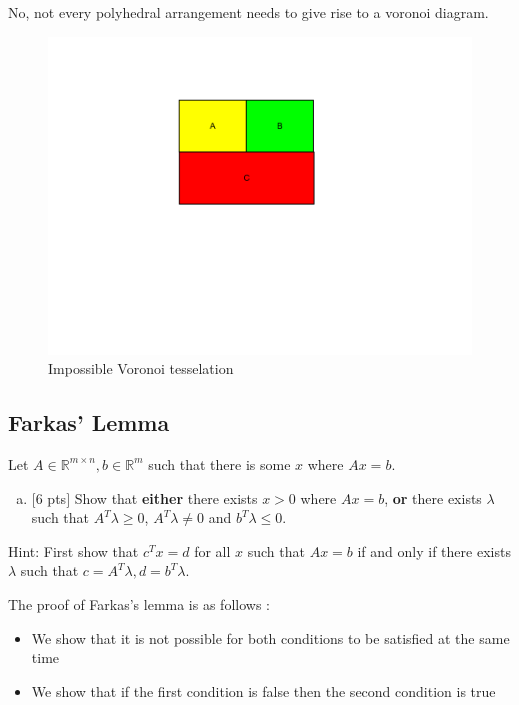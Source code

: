 \documentclass[12pt]{article}
\begin{document}
No, not every polyhedral arrangement needs to give rise to a voronoi diagram. 
\begin{figure}[h!]
  \centering
    \includegraphics[width=\textwidth]{voronoi}
  \caption{Impossible Voronoi tesselation}
\end{figure}

\clearpage

\subsection{Farkas' Lemma}

Let $A\in\mathbb{R}^{m\times n}, b\in\mathbb{R}^m$ such that there is some $x$ where $Ax = b$.

\begin{enumerate}[(a)]
\item
$[$6 pts$]$  Show that {\bf either} there exists $x > 0$ where $Ax = b$, {\bf or} there exists $\lambda$ such that $A^T\lambda \ge 0$, $A^T\lambda \ne 0$ and $b^T\lambda \le 0$.
\end{enumerate}
Hint: First show that $c^Tx = d$ for all $x$ such that $Ax = b$ if and only if there exists $\lambda$ such that $c= A^T\lambda, d=b^T\lambda$.

The proof of Farkas's lemma is as follows : 
\begin{itemize}
\item We show that it is not possible for both conditions to be satisfied at the same time
\item We show that if the first condition is false then the second condition is true
\end{itemize}
\end{document}
